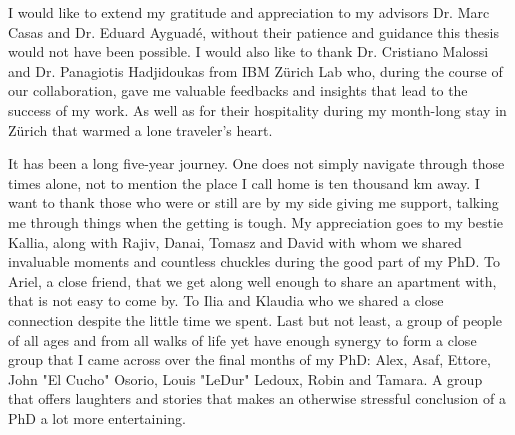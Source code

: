 
\begin{acknowledgements}
	I would like to extend my gratitude and appreciation to my advisors Dr. Marc
	Casas and Dr. Eduard Ayguad\'{e}, without their patience and guidance this
	thesis would not have been possible. I would also like to thank Dr.
	Cristiano Malossi and Dr. Panagiotis Hadjidoukas from IBM Z\"{u}rich Lab
	who, during the course of our collaboration, gave me valuable feedbacks and
	insights that lead to the success of my work. As well as for their
	hospitality during my month-long stay in Z\"{u}rich that warmed a lone
	traveler's heart.

    It has been a long five-year journey. One does not simply navigate through
    those times alone, not to mention the place I call home is ten thousand km
    away. I want to thank those who were or still are by my side giving me
    support, talking me through things when the getting is tough. My
    appreciation goes to my bestie Kallia, along with Rajiv, Danai, Tomasz and
    David with whom we shared invaluable moments and countless chuckles during 
    the good part of my PhD. To Ariel, a close friend, that we get along well 
    enough to share an apartment with, that is not easy to come by. To Ilia and 
    Klaudia who we shared a close connection despite the little time we spent. 
    Last but not least, a group of people of all ages and from all walks of life 
    yet have enough synergy to form a close group that I came across over the 
    final months of my PhD: Alex, Asaf, Ettore, John "El Cucho" Osorio, Louis 
    "LeDur" Ledoux, Robin and Tamara. A group that offers laughters and stories 
    that makes an otherwise stressful conclusion of a PhD a lot more entertaining.	

\end{acknowledgements}
